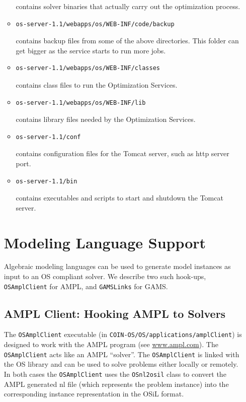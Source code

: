 \documentclass[11pt]{article}
\renewcommand{\_}{{\char"5F}}
\renewcommand{\{}{{\char"7B}}
\renewcommand{\}}{{\char"7D}}
\renewcommand{\^}{{\char"0D}}
\renewcommand{\'}{{\char"0D}}
\begin{document}
\begin{enumerate}[Step 1:]
\begin{itemize}
\begin{verbatim}
\end{verbatim}
contains solver binaries that actually carry out the optimization process.
\item
\begin{verbatim}
os-server-1.1/webapps/os/WEB-INF/code/backup
\end{verbatim}
contains backup files from some of the above directories. This folder can get bigger as the service starts to run more jobs.
\item
\begin{verbatim}
os-server-1.1/webapps/os/WEB-INF/classes
\end{verbatim}
contains class files to run the Optimization Services.
\item
\begin{verbatim}
os-server-1.1/webapps/os/WEB-INF/lib
\end{verbatim}
contains library files needed by the Optimization Services.
\item
\begin{verbatim}
os-server-1.1/conf
\end{verbatim}
contains configuration files for the Tomcat server, such as http server port.
\item
\begin{verbatim}
os-server-1.1/bin
\end{verbatim}
contains executables and scripts to start and shutdown the Tomcat server.
\end{itemize}




\section{Modeling Language Support}\label{section:modellang}

Algebraic modeling languages can be used to generate model instances as input to an OS compliant solver. 
We describe two such hook-ups, {\tt OSAmplClient} for AMPL, and {\tt GAMSLinks} for GAMS.


\subsection{AMPL Client:  Hooking AMPL to Solvers}\label{section:amplclient}

The {\tt OSAmplClient} executable (in {\tt COIN-OS/OS/applications/amplClient}) is designed to work with the AMPL program 
(see \url{www.ampl.com}). The {\tt OSAmplClient} acts like an AMPL ``solver''. The {\tt OSAmplClient} is linked with the 
OS library and can be used to solve problems either locally or remotely. In both cases the {\tt OSAmplClient} uses the 
{\tt OSnl2osil} class to convert the AMPL generated nl file 
(which represents the problem instance) into the corresponding instance representation in the OSiL format.


\end{enumerate}
\end{document}
